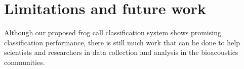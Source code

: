 
%
%

\section{Limitations and future work}
Although our proposed frog call classification system shows promising classification performance, there is still much work that can be done to help scientists and researchers in data collection and analysis in the bioacoustics communities.


